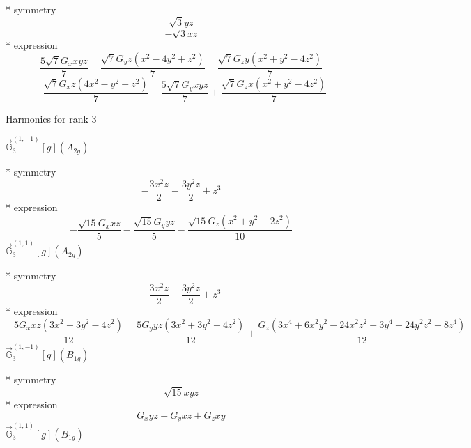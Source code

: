 \documentclass[fleqn,8pt]{jsarticle}
\begin{document}
\noindent\quad ** symmetry
\begin{dmath*}
\sqrt{3} y z
\end{dmath*}
\begin{dmath*}
- \sqrt{3} x z
\end{dmath*}
\noindent\quad ** expression
\begin{dmath*}
\frac{5 \sqrt{7} G_{x} x y z}{7} - \frac{\sqrt{7} G_{y} z \left(x^{2} - 4 y^{2} + z^{2}\right)}{7} - \frac{\sqrt{7} G_{z} y \left(x^{2} + y^{2} - 4 z^{2}\right)}{7}
\end{dmath*}
\begin{dmath*}
- \frac{\sqrt{7} G_{x} z \left(4 x^{2} - y^{2} - z^{2}\right)}{7} - \frac{5 \sqrt{7} G_{y} x y z}{7} + \frac{\sqrt{7} G_{z} x \left(x^{2} + y^{2} - 4 z^{2}\right)}{7}
\end{dmath*}

\noindent * Harmonics for rank 3

\noindent\quad $\vec{\mathbb{G}}_{3}^{(1,-1)}[g](A_{2g})$

\noindent\quad ** symmetry
\begin{dmath*}
- \frac{3 x^{2} z}{2} - \frac{3 y^{2} z}{2} + z^{3}
\end{dmath*}
\noindent\quad ** expression
\begin{dmath*}
- \frac{\sqrt{15} G_{x} x z}{5} - \frac{\sqrt{15} G_{y} y z}{5} - \frac{\sqrt{15} G_{z} \left(x^{2} + y^{2} - 2 z^{2}\right)}{10}
\end{dmath*}
\noindent\quad $\vec{\mathbb{G}}_{3}^{(1,1)}[g](A_{2g})$

\noindent\quad ** symmetry
\begin{dmath*}
- \frac{3 x^{2} z}{2} - \frac{3 y^{2} z}{2} + z^{3}
\end{dmath*}
\noindent\quad ** expression
\begin{dmath*}
- \frac{5 G_{x} x z \left(3 x^{2} + 3 y^{2} - 4 z^{2}\right)}{12} - \frac{5 G_{y} y z \left(3 x^{2} + 3 y^{2} - 4 z^{2}\right)}{12} + \frac{G_{z} \left(3 x^{4} + 6 x^{2} y^{2} - 24 x^{2} z^{2} + 3 y^{4} - 24 y^{2} z^{2} + 8 z^{4}\right)}{12}
\end{dmath*}
\noindent\quad $\vec{\mathbb{G}}_{3}^{(1,-1)}[g](B_{1g})$

\noindent\quad ** symmetry
\begin{dmath*}
\sqrt{15} x y z
\end{dmath*}
\noindent\quad ** expression
\begin{dmath*}
G_{x} y z + G_{y} x z + G_{z} x y
\end{dmath*}
\noindent\quad $\vec{\mathbb{G}}_{3}^{(1,1)}[g](B_{1g})$
\end{document}
